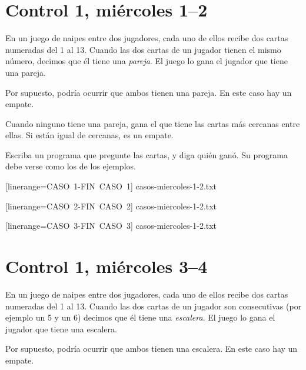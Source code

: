 \documentclass[12pt,spanish,a5paper,landscape]{article}
\begin{document}
  \pagestyle{empty}
  \thispagestyle{empty}

  \part*{Control 1, miércoles 1--2}
  \newpage

  En un juego de naipes entre dos jugadores,
  cada uno de ellos recibe dos cartas numeradas del 1 al 13.
  Cuando las dos cartas de un jugador tienen el mismo número,
  decimos que él tiene una \emph{pareja}.
  El juego lo gana el jugador que tiene una pareja.

  Por supuesto,
  podría ocurrir que ambos tienen una pareja.
  En este caso hay un empate.

  Cuando ninguno tiene una pareja,
  gana el que tiene las cartas más cercanas entre ellas.
  Si están igual de cercanas, es un empate.

  Escriba un programa que pregunte las cartas,
  y diga quién ganó.
  Su programa debe verse como los de los ejemplos.

  \begin{minipage}{0.25\textwidth}
      [linerange=CASO\ 1-FIN\ CASO\ 1]%
      {casos-miercoles-1-2.txt}
  \end{minipage}
  \hspace{1em}
  \begin{minipage}{0.25\textwidth}
      [linerange=CASO\ 2-FIN\ CASO\ 2]%
      {casos-miercoles-1-2.txt}
  \end{minipage}
  \hspace{1em}
  \begin{minipage}{0.25\textwidth}
      [linerange=CASO\ 3-FIN\ CASO\ 3]%
      {casos-miercoles-1-2.txt}
  \end{minipage}

  \newpage
  \part*{Control 1, miércoles 3--4}
  \newpage

  En un juego de naipes entre dos jugadores,
  cada uno de ellos recibe dos cartas numeradas del 1 al 13.
  Cuando las dos cartas de un jugador son consecutivas
  (por ejemplo un 5 y un 6)
  decimos que él tiene una \emph{escalera}.
  El juego lo gana el jugador que tiene una escalera.

  Por supuesto,
  podría ocurrir que ambos tienen una escalera.
  En este caso hay un empate.
\end{document}
